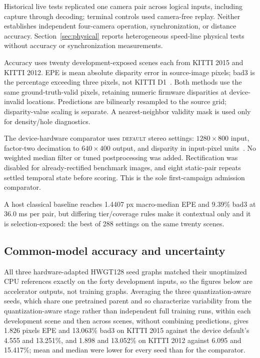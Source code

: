 \documentclass[sigconf,review,anonymous]{acmart}
\begin{document}
Historical live tests replicated one camera pair across logical inputs, including capture through decoding; terminal controls used camera-free replay. Neither establishes independent four-camera operation, synchronization, or distance accuracy. Section~\ref{sec:physical} reports heterogeneous speed-line physical tests without accuracy or synchronization measurements.

Accuracy uses twenty development-exposed scenes each from KITTI 2015 and KITTI 2012. EPE is mean absolute disparity error in source-image pixels; bad3 is the percentage exceeding three pixels, not KITTI D1~\cite{kittistereo}. Both methods use the same ground-truth-valid pixels, retaining numeric firmware disparities at device-invalid locations. Predictions are bilinearly resampled to the source grid; disparity-value scaling is separate. A nearest-neighbor validity mask is used only for density/hole diagnostics.

The device-hardware comparator uses \textsc{default} stereo settings: $1280\times800$ input, factor-two decimation to $640\times400$ output, and disparity in input-pixel units~\cite{luxonisstereodepth}. No weighted median filter or tuned postprocessing was added. Rectification was disabled for already-rectified benchmark images, and eight static-pair repeats settled temporal state before scoring. This is the sole first-campaign admission comparator.

A host classical baseline reaches 1.4407 px macro-median EPE and 9.39\% bad3 at 36.0 ms per pair, but differing tier/coverage rules make it contextual only and it is selection-exposed: the best of 288 settings on the same twenty scenes.


\subsection{Common-model accuracy and uncertainty}
\label{sec:acc}

All three hardware-adapted HWGT128 seed graphs matched their unoptimized CPU references exactly on the forty development inputs, so the figures below are accelerator outputs, not training graphs. Averaging the three quantization-aware seeds, which share one pretrained parent and so characterize variability from the quantization-aware stage rather than independent full training runs, within each development scene and then across scenes, without combining predictions, gives 1.826 pixels EPE and 13.063\% bad3 on KITTI 2015 against the device default's 4.555 and 13.251\%, and 1.898 and 13.052\% on KITTI 2012 against 6.095 and 15.417\%; mean and median were lower for every seed than for the comparator.
\end{document}
